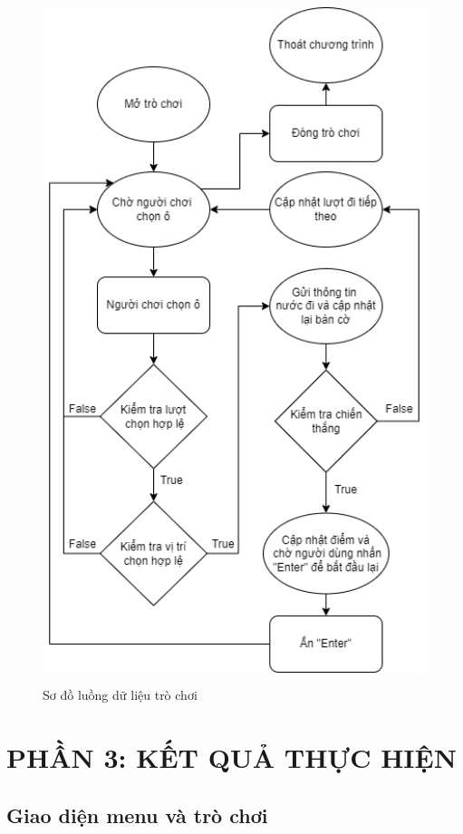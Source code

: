 \documentclass[a4paper]{article}
\begin{document}
\begin{figure}[H]
    \includegraphics[width=14cm, height=20cm]{images/game_flowchart.png}
    \caption*{Sơ đồ luồng dữ liệu trò chơi}
\end{figure}

\newpage

\section*{PHẦN 3: KẾT QUẢ THỰC HIỆN}
\setcounter{section}{3}
\setcounter{subsection}{0}
\subsection{Giao diện menu và trò chơi}
\end{document}
